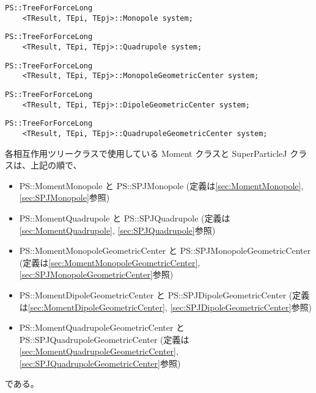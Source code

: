 \begin{screen}
\begin{verbatim}
PS::TreeForForceLong
    <TResult, TEpi, TEpj>::Monopole system;
\end{verbatim}
\end{screen}


\begin{screen}
\begin{verbatim}
PS::TreeForForceLong
    <TResult, TEpi, TEpj>::Quadrupole system;
\end{verbatim}
\end{screen}

\begin{screen}
\begin{verbatim}
PS::TreeForForceLong
    <TResult, TEpi, TEpj>::MonopoleGeometricCenter system;
\end{verbatim}
\end{screen}
\begin{screen}
\begin{verbatim}
PS::TreeForForceLong
    <TResult, TEpi, TEpj>::DipoleGeometricCenter system;
\end{verbatim}
\end{screen}

\begin{screen}
\begin{verbatim}
PS::TreeForForceLong
    <TResult, TEpi, TEpj>::QuadrupoleGeometricCenter system;
\end{verbatim}
\end{screen}

各相互作用ツリークラスで使用している Moment クラスと SuperParticleJ クラスは、上記の順で、
\begin{itemize}%
\item PS::MomentMonopole と PS::SPJMonopole (定義は\ref{sec:MomentMonopole}, \ref{sec:SPJMonopole}参照)
\item PS::MomentQuadrupole と PS::SPJQuadrupole (定義は\ref{sec:MomentQuadrupole}, \ref{sec:SPJQuadrupole}参照)
\item PS::MomentMonopoleGeometricCenter と PS::SPJMonopoleGeometricCenter (定義は\ref{sec:MomentMonopoleGeometricCenter}, \ref{sec:SPJMonopoleGeometricCenter}参照)
\item PS::MomentDipoleGeometricCenter と PS::SPJDipoleGeometricCenter (定義は\ref{sec:MomentDipoleGeometricCenter}, \ref{sec:SPJDipoleGeometricCenter}参照)
\item PS::MomentQuadrupoleGeometricCenter と PS::SPJQuadrupoleGeometricCenter (定義は\ref{sec:MomentQuadrupoleGeometricCenter}, \ref{sec:SPJQuadrupoleGeometricCenter}参照)
\end{itemize}
である。


